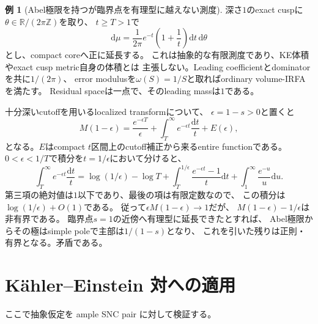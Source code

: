 \documentclass[11pt,a4paper]{ltjsarticle}
\newcommand{\RR}{\mathbb R}
\newcommand{\ZZ}{\mathbb Z}
\newcommand{\dd}{\mathrm d}
\theoremstyle{plain}
\theoremstyle{definition}
\newtheorem{example}[example]{例}
\theoremstyle{remark}
\begin{document}
\begin{example}[Abel極限を持つが臨界点を有理型に越えない測度]
\label{ex:Abel-not-meromorphic}
深さ$1$のexact cuspに$\theta\in\RR/(2\pi\ZZ)$を取り、
$t\ge T>1$で
\[
 \dd\mu=\frac1{2\pi}e^{-t}\left(1+\frac1t\right)
        \dd t\,\dd\theta
\]
とし、compact coreへ正に延長する。
これは抽象的な有限測度であり、KE体積やexact cusp metric自身の体積とは
主張しない。Leading coefficientとdominatorを共に$1/(2\pi)$、
error modulusを$\omega(S)=1/S$と取ればordinary volume-IRFAを満たす。
Residual spaceは一点で、そのleading massは$1$である。

十分深いcutoffを用いるlocalized transformについて、
$\epsilon=1-s>0$と置くと
\[
 M(1-\epsilon)=\frac{e^{-\epsilon T}}{\epsilon}
       +\int_T^\infty e^{-\epsilon t}\frac{\dd t}{t}+E(\epsilon),
\]
となる。$E$はcompact $t$区間上のcutoff補正から来るentire functionである。
$0<\epsilon<1/T$で積分を$t=1/\epsilon$において分けると、
\[
 \int_T^\infty e^{-\epsilon t}\frac{\dd t}{t}
 =\log(1/\epsilon)-\log T
  +\int_T^{1/\epsilon}\frac{e^{-\epsilon t}-1}{t}\dd t
  +\int_1^\infty\frac{e^{-u}}u\dd u.
\]
第三項の絶対値は$1$以下であり、最後の項は有限定数なので、
この積分は$\log(1/\epsilon)+O(1)$である。
従って$\epsilon M(1-\epsilon)\to1$だが、
$M(1-\epsilon)-1/\epsilon$は非有界である。
臨界点$s=1$の近傍へ有理型に延長できたとすれば、
Abel極限からその極はsimple poleで主部は$1/(1-s)$となり、
これを引いた残りは正則・有界となる。矛盾である。
\end{example}

\section{K\"ahler--Einstein 対への適用}
\label{sec:KE}

ここで抽象仮定を ample SNC pair に対して検証する。
\end{document}
